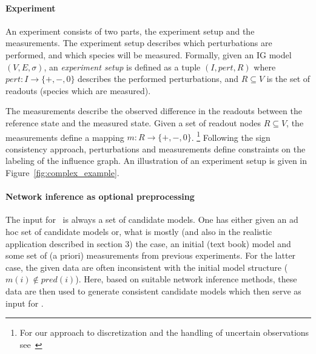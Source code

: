 \paragraph*{\bf Experiment}

An experiment consists of two parts, the experiment setup and the measurements.
The experiment setup describes which perturbations are performed,
 and which species will be measured.
Formally, given an IG model $(V,E,\sigma)$,
 an \emph{experiment setup} is defined as a tuple $(I,pert,R)$ where
 $pert: I \rightarrow \{ \plus, \minus, 0 \}$ describes the performed perturbations,
 and $R\subseteq V$ is the set of readouts  (species which are measured).

The measurements describe the observed difference in the readouts
 between the reference state and the measured state.
Given a set of readout nodes $R \subseteq V$, the measurements define a mapping
 $m : R \rightarrow \{\plus, \minus, 0\}$.
 \footnote{For our approach to discretization and the handling of uncertain observations see~\cite{sthiele15}}
%
Following the sign consistency approach, perturbations and measurements define
constraints on the labeling of the influence graph.
An illustration of an experiment setup is given in Figure~\ref{fig:complex_example}.


\paragraph*{\bf Network inference as optional preprocessing}

The input for \expidesi\ is always a set of candidate models.
One has either given an ad hoc set of candidate models or,
what is mostly (and also in the realistic application described in section 3) the case,
an initial (text book) model and some set of (a priori) measurements from previous experiments.
For the latter case, the given data are often inconsistent with the initial model structure ($m(i) \notin pred(i)$).
Here, based on suitable network inference methods,
these data are then used to generate consistent candidate models which then serve as input for \expidesi.

